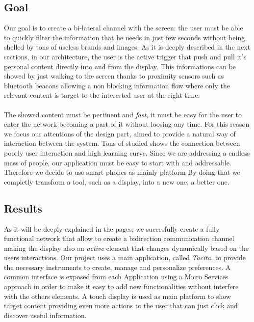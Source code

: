 \documentclass[]{usiinfbachelorproject}
\begin{document}
\subsection{Goal}

Our goal is to create a bi-lateral channel with the screen: the user must be able to quickly filter the information that he needs in just few seconds without being shelled by tons of useless brands and images. As it is deeply described in the next sections, in our architecture, the user is the active trigger that push and pull it's personal content directly into and from the display. This informations can be showed by just walking to the screen thanks to proximity sensors such as bluetooth beacons allowing a non blocking information flow where only the relevant content is target to the interested user at the right time.
\\
\\
The showed content must be pertinent and \emph{fast}, it must be easy for the user to enter the network becoming a part of it without loosing any time. For this reason we focus our attentions of the design part, aimed to provide a natural way of interaction between the system. Tons of studied shows the connection between poorly user interaction and high learning curve. Since we are addressing a endless mass of people, our application must be easy to start with and addressable. Therefore we decide to use smart phones as mainly platform
By doing that we completly transform a tool, such as a display, into a new one, a better one.

\subsection{Results}
As it will be deeply explained in the pages, we succesfully create a fully functional network that allow to create a bidirection communication channel making the display also an \emph{active} element that changes dynamically based on the users interactions. Our project uses a main application, called \emph{Tacita}, to provide the necessary instruments to create, manage and personalize preferences. A common interface is exposed from each Application using a Micro Services approach in order to make it easy to add new functionalities without interfere with the others elements.
A touch display is used as main platform to show target content providing even more actions to the user that can just click and discover useful information.
\end{document}
